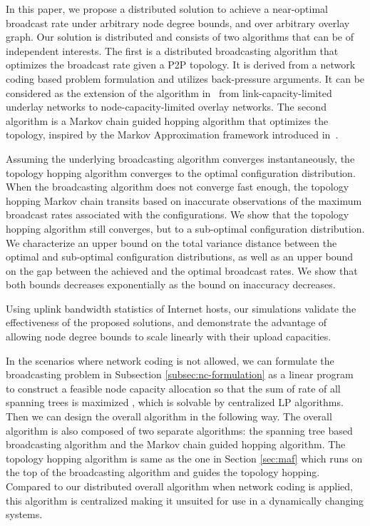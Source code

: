 \documentclass[10pt,conference]{IEEEtran}
\begin{document}
In this paper, we propose a distributed solution to achieve a
near-optimal broadcast rate under arbitrary node degree bounds, and
over arbitrary overlay graph. Our solution is distributed and
consists of two algorithms that can be of independent interests. The
first is a distributed broadcasting algorithm that optimizes the
broadcast rate given a P2P topology. It is derived from a network
coding based problem formulation and utilizes back-pressure
arguments. It can be considered as the extension of the algorithm
in~\cite{ho2009dynamic} from link-capacity-limited underlay networks
to node-capacity-limited overlay networks. The second algorithm is a
Markov chain guided hopping algorithm that optimizes the topology,
inspired by the Markov Approximation framework introduced
in~\cite{MA:CLSC10}.

Assuming the underlying broadcasting algorithm converges instantaneously,
the topology hopping algorithm converges to the optimal configuration
distribution. When the broadcasting algorithm does not converge fast enough,
the topology hopping Markov chain transits based on inaccurate observations of the maximum broadcast rates associated with the configurations.
We show that the topology hopping algorithm still converges, but to a sub-optimal configuration distribution. We characterize an upper bound on the total variance
distance between the optimal and sub-optimal configuration distributions, as well as an upper bound on the gap between the achieved and the optimal broadcast rates. We show that both bounds decreases exponentially as the bound on inaccuracy decreases.

Using uplink bandwidth statistics of Internet hosts, our simulations
validate the effectiveness of the proposed solutions, and demonstrate
the advantage of allowing node degree bounds to scale linearly with
their upload capacities.

In the scenarios where network coding is not allowed, we can formulate the broadcasting problem in Subsection \ref{subsec:nc-formulation} as a linear program to construct a feasible node capacity allocation so that the sum of rate of all spanning
trees is maximized \cite{streaming_capacity.allerton09}, which is solvable by centralized LP algorithms. Then we can design the overall algorithm in the following way. The overall algorithm is also composed of two separate algorithms: the spanning tree based broadcasting algorithm and the Markov chain guided hopping algorithm. The topology hopping algorithm is same as the one in Section \ref{sec:maf} which runs on the top of the broadcasting algorithm and guides the topology hopping. Compared to our distributed overall algorithm when network coding is applied, this algorithm is centralized making it unsuited for use in a dynamically changing systems.
\end{document}
